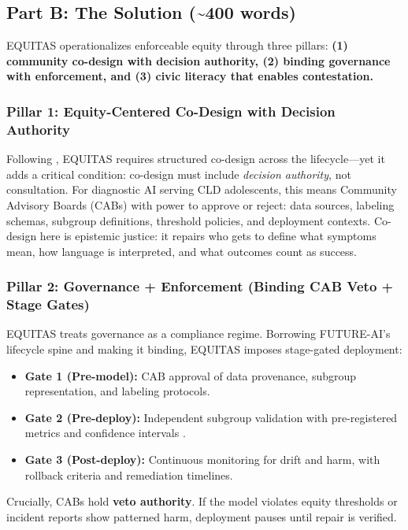 \subsection{Part B: The Solution (\texorpdfstring{\textasciitilde}{~}400 words)}
EQUITAS operationalizes enforceable equity through three pillars: \textbf{(1) community co-design with decision authority, (2) binding governance with enforcement, and (3) civic literacy that enables contestation.}

\subsubsection{Pillar 1: Equity-Centered Co-Design with Decision Authority}
Following \citet{Nadarzynski2024}, EQUITAS requires structured co-design across the lifecycle—yet it adds a critical condition: co-design must include \emph{decision authority}, not consultation. For diagnostic AI serving CLD adolescents, this means Community Advisory Boards (CABs) with power to approve or reject: data sources, labeling schemas, subgroup definitions, threshold policies, and deployment contexts. Co-design here is epistemic justice: it repairs who gets to define what symptoms mean, how language is interpreted, and what outcomes count as success.

\subsubsection{Pillar 2: Governance + Enforcement (Binding CAB Veto + Stage Gates)}
EQUITAS treats governance as a compliance regime. Borrowing FUTURE-AI’s lifecycle spine \citep{Lekadir2025} and making it binding, EQUITAS imposes stage-gated deployment:
\begin{itemize}
  \setlength\itemsep{0.15em}
  \item \textbf{Gate 1 (Pre-model):} CAB approval of data provenance, subgroup representation, and labeling protocols.
  \item \textbf{Gate 2 (Pre-deploy):} Independent subgroup validation with pre-registered metrics and confidence intervals \citep{Chen2023}.
  \item \textbf{Gate 3 (Post-deploy):} Continuous monitoring for drift and harm, with rollback criteria and remediation timelines.
\end{itemize}
Crucially, CABs hold \textbf{veto authority}. If the model violates equity thresholds or incident reports show patterned harm, deployment pauses until repair is verified.

